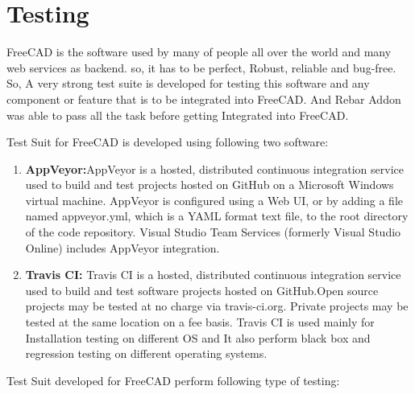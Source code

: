 \section{Testing}

FreeCAD is the software used by many of people all over the world and many web services as backend. so, it has to be perfect, Robust, reliable and bug-free. So, A very strong test suite is developed for testing this software and any component or feature that is to be integrated into FreeCAD. And Rebar Addon was able to pass all the task before getting Integrated into FreeCAD.

Test Suit for FreeCAD is developed using following two software:

\begin{enumerate}
    \item \textbf{AppVeyor:}AppVeyor is a hosted, distributed continuous integration service used to build and test projects hosted on GitHub on a Microsoft Windows virtual machine. AppVeyor is configured using a Web UI, or by adding a file named appveyor.yml, which is a YAML format text file, to the root directory of the code repository. Visual Studio Team Services (formerly Visual Studio Online) includes AppVeyor integration.
    
    \item \textbf{Travis CI:} Travis CI is a hosted, distributed continuous integration service used to build and test software projects hosted on GitHub.Open source projects may be tested at no charge via travis-ci.org. Private projects may be tested at the same location on a fee basis.
    Travis CI is used mainly for Installation testing on different OS and It also perform  black box and regression testing on different operating systems.
   
\end{enumerate}

Test Suit developed for FreeCAD perform following type of testing:
 
